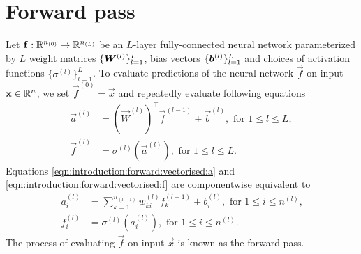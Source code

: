 \section{Forward pass}
Let $\mathbf{f} : {\mathbb R}^{n_{(0)}} \to {\mathbb R}^{n_{(L)}}$ be an $L$-layer fully-connected neural network parameterized by $L$ weight matrices $\{ \bm{W}^{(l)}  \}_{l=1}^{L}$, bias vectors $\{  \bm{b}^{(l)} \}_{l=1}^{L}$ and choices of activation functions $\{ \sigma^{(l)} \}_{l=1}^{L}$. 
To evaluate predictions of the neural network $\vec{f}$ on input $\mathbf{x} \in {\mathbb R}^n$, we set $\vec{f}^{(0)} = \vec{x}$ and repeatedly evaluate following equations
\begin{subequations}
\begin{align}
    \vec{a}^{(l)} &= (\vec{W}^{(l)})^{\top} \vec{f}^{(l - 1)} + \vec{b}^{(l)}, \text{ for $1 \leq l \leq L$}, \label{eqn:introduction:forward:vectorised:a}  \\
    \vec{f}^{(l)} &= \sigma ^{(l)}(\vec{a}^{(l)}), \text{ for $1 \leq l \leq L$}. \label{eqn:introduction:forward:vectorised:f}
\end{align}
\end{subequations}
Equations \ref{eqn:introduction:forward:vectorised:a} and \ref{eqn:introduction:forward:vectorised:f} are componentwise equivalent to
\begin{subequations}
\begin{align}
    a_{i}^{(l)} &= \sum_{k = 1}^{n_{(l-1)}} w_{ki}^{(l)} f_{k}^{(l-1)} + b^{(l)}_i, \text{ for $1 \leq i \leq n^{(l)}$,} \label{eqn:introduction:forward:explicit:a} \\
    f^{(l)}_{i} &= \sigma ^{(l)}(a_{i}^{(l)}), \text{ for $1 \leq i \leq n^{(l)}$.} \label{eqn:introduction:forward:explicit:f}
\end{align}
\end{subequations}
The process of evaluating $\vec{f}$ on input $\vec{x}$ is known as the forward pass. 